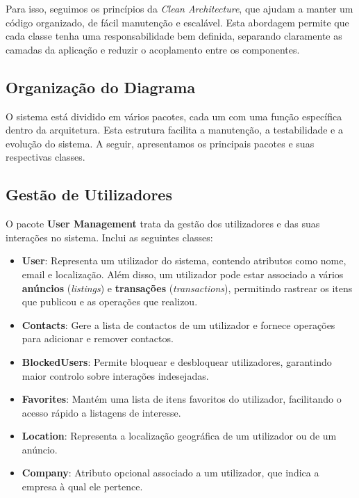\documentclass[a4paper, 12pt]{article} %
\begin{document}
Para isso, seguimos os princípios da \textit{Clean Architecture}, que ajudam a manter um código organizado, de fácil manutenção e escalável. Esta abordagem permite que cada classe tenha uma responsabilidade bem definida, separando claramente as camadas da aplicação e reduzir o acoplamento entre os componentes.

\subsection{Organização do Diagrama}  

O sistema está dividido em vários pacotes, cada um com uma função específica dentro da arquitetura. Esta estrutura facilita a manutenção, a testabilidade e a evolução do sistema. A seguir, apresentamos os principais pacotes e suas respectivas classes.

\subsection{Gestão de Utilizadores}

O pacote \textbf{User Management} trata da gestão dos utilizadores e das suas interações no sistema. Inclui as seguintes classes:

\begin{itemize}
	\item \textbf{User}: Representa um utilizador do sistema, contendo atributos como nome, email e localização. Além disso, um utilizador pode estar associado a vários \textbf{anúncios} (\textit{listings}) e \textbf{transações} (\textit{transactions}), permitindo rastrear os itens que publicou e as operações que realizou.
	\item \textbf{Contacts}: Gere a lista de contactos de um utilizador e fornece operações para adicionar e remover contactos.
	\item \textbf{BlockedUsers}: Permite bloquear e desbloquear utilizadores, garantindo maior controlo sobre interações indesejadas.
	\item \textbf{Favorites}: Mantém uma lista de itens favoritos do utilizador, facilitando o acesso rápido a listagens de interesse.
	\item \textbf{Location}: Representa a localização geográfica de um utilizador ou de um anúncio.
	\item \textbf{Company}: Atributo opcional associado a um utilizador, que indica a empresa à qual ele pertence.
\end{itemize}
\end{document}
